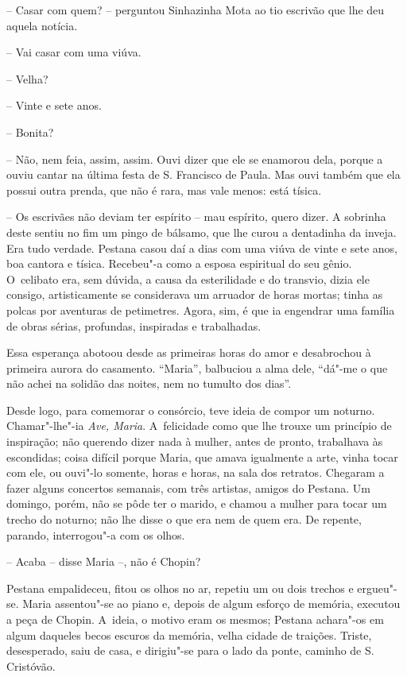 -- Casar com quem? -- perguntou Sinhazinha Mota ao tio escrivão que lhe
deu aquela notícia.

-- Vai casar com uma viúva.

-- Velha?

-- Vinte e sete anos.

-- Bonita?

-- Não, nem feia, assim, assim. Ouvi dizer que ele se enamorou dela,
porque a ouviu cantar na última festa de S. Francisco de Paula. Mas ouvi
também que ela possui outra prenda, que não é rara, mas vale menos: está
tísica.

-- Os escrivães não deviam ter espírito -- mau espírito, quero dizer. A
sobrinha deste sentiu no fim um pingo de bálsamo, que lhe curou a
dentadinha da inveja. Era tudo verdade. Pestana casou daí a dias com uma
viúva de vinte e sete anos, boa cantora e tísica. Recebeu"-a como a
esposa espiritual do seu gênio. O~celibato era, sem dúvida, a causa da
esterilidade e do transvio, dizia ele consigo, artisticamente se
considerava um arruador de horas mortas; tinha as polcas por aventuras
de petimetres. Agora, sim, é que ia engendrar uma família de obras
sérias, profundas, inspiradas e trabalhadas.

Essa esperança abotoou desde as primeiras horas do amor e desabrochou à
primeira aurora do casamento. ``Maria'', balbuciou a alma dele, ``dá"-me
o que não achei na solidão das noites, nem no tumulto dos dias''.

Desde logo, para comemorar o consórcio, teve ideia de compor um noturno.
Chamar"-lhe"-ia \emph{Ave, Maria}. A~felicidade como que lhe trouxe um
princípio de inspiração; não querendo dizer nada à mulher, antes de
pronto, trabalhava às escondidas; coisa difícil porque Maria, que amava
igualmente a arte, vinha tocar com ele, ou ouvi"-lo somente, horas e
horas, na sala dos retratos. Chegaram a fazer alguns concertos semanais,
com três artistas, amigos do Pestana. Um domingo, porém, não se pôde ter
o marido, e chamou a mulher para tocar um trecho do noturno; não lhe
disse o que era nem de quem era. De repente, parando, interrogou"-a com
os olhos.

-- Acaba -- disse Maria --, não é Chopin?

Pestana empalideceu, fitou os olhos no ar, repetiu um ou dois trechos e
ergueu"-se. Maria assentou"-se ao piano e, depois de algum esforço de
memória, executou a peça de Chopin. A~ideia, o motivo eram os mesmos;
Pestana achara"-os em algum daqueles becos escuros da memória, velha
cidade de traições. Triste, desesperado, saiu de casa, e dirigiu"-se para
o lado da ponte, caminho de S. Cristóvão.

